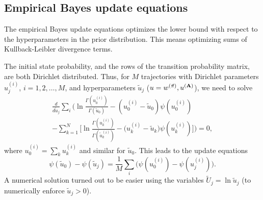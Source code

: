 \subsection{Empirical Bayes update equations}
The empirical Bayes update equations optimizes the lower bound with
respect to the hyperparameters in the prior distribution. This means
optimizing sums of Kullback-Leibler divergence terms. 

The initial state probability, and the rows of the transition
probability matrix, are both Dirichlet distributed. Thus, for $M$
trajectories with Dirichlet parameters $u_j^{(i)}$, $i=1,2,\ldots,M$,
and hyperparameters $\tilde{u}_j$ ($u = w^{(\vec\pi)},u^{(\mathbf{A})}$),
we need to solve
\begin{multline}
\frac{d}{d \tilde u_j} \sum_i\Bigg( 
 \ln\frac{\Gamma(u_0^{(i)})}{\Gamma(\tilde u_0)}
    -(u_0^{(i)}-\tilde u_0)\psi(u_0^{(i)})\\
    -\sum_{k=1}^N\bigg[
      \ln\frac{\Gamma(u_k^{(i)})}{\Gamma(\tilde u_k^{(i)})}
      -\big(u_k^{(i)}-\tilde u_k\big)
      \psi(u_k^{(i)})\bigg]\Bigg)=0,
\end{multline}
where $u_0^{(i)}=\sum_ku_k^{(i)}$ and similar for $\tilde u_0$. This
leads to the update equations
\begin{equation}
  \psi(\tilde u_0)-\psi(\tilde u_j)
=\frac{1}{M}\sum_i\bigg(
  \psi(u_0^{(i)})-\psi(u_j^{(i)})\bigg).
\end{equation}
A numerical solution turned out to be easier using the variables
$\tilde U_j=\ln \tilde u_j$ (to numerically enforce $\tilde u_j>0$).

